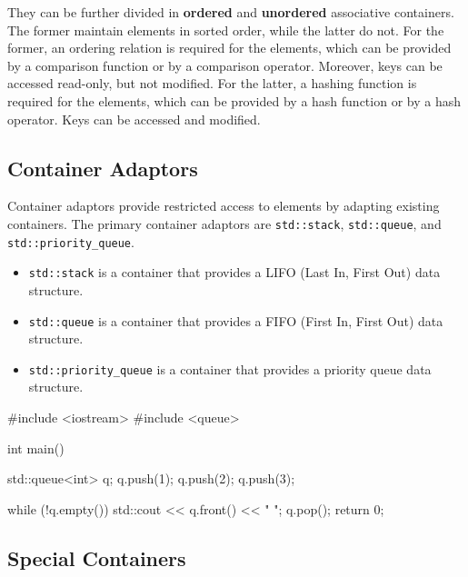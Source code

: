 They can be further divided in \textbf{ordered} and \textbf{unordered} associative containers. The former maintain elements in sorted order, while the latter do not.
For the former, an ordering relation is required for the elements, which can be provided by a comparison function or by a comparison operator. Moreover, keys can be accessed read-only, but not modified.
For the latter, a hashing function is required for the elements, which can be provided by a hash function or by a hash operator. Keys can be accessed and modified.

\subsection{Container Adaptors}

Container adaptors provide restricted access to elements by adapting existing containers. The primary container adaptors are \texttt{std::stack}, \texttt{std::queue}, and \texttt{std::priority\_queue}.
\begin{itemize}
    \item \texttt{std::stack} is a container that provides a LIFO (Last In, First Out) data structure.
    \item \texttt{std::queue} is a container that provides a FIFO (First In, First Out) data structure.
    \item \texttt{std::priority\_queue} is a container that provides a priority queue data structure.
\end{itemize}

\begin{exampleblock}
    \begin{codeblock}[language=C++]
#include <iostream>
#include <queue>

int main() {
    std::queue<int> q;
    q.push(1);
    q.push(2);
    q.push(3);

    while (!q.empty()) {
        std::cout << q.front() << " ";
        q.pop();
    }
    return 0;
}

    \end{codeblock}
\end{exampleblock}

\subsection{Special Containers}

